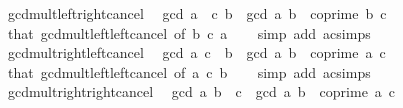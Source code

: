 \begin{isabellebody}
\isamarkupfalse%
%
\endisatagproof
{\isafoldproof}%
%
\isadelimproof
\isanewline
%
\endisadelimproof
\isanewline
{}\isamarkupfalse%
\ gcd{\isacharunderscore}{\kern0pt}mult{\isacharunderscore}{\kern0pt}left{\isacharunderscore}{\kern0pt}right{\isacharunderscore}{\kern0pt}cancel{\isacharcolon}{\kern0pt}\isanewline
\ \ {\isachardoublequoteopen}gcd\ {\isacharparenleft}{\kern0pt}a\ {\isacharasterisk}{\kern0pt}\ c{\isacharparenright}{\kern0pt}\ b\ {\isacharequal}{\kern0pt}\ gcd\ a\ b{\isachardoublequoteclose}\ \ {\isachardoublequoteopen}coprime\ b\ c{\isachardoublequoteclose}\isanewline
%
\isadelimproof
\ \ %
\endisadelimproof
%
\isatagproof
{}\isamarkupfalse%
\ that\ gcd{\isacharunderscore}{\kern0pt}mult{\isacharunderscore}{\kern0pt}left{\isacharunderscore}{\kern0pt}left{\isacharunderscore}{\kern0pt}cancel\ {\isacharbrackleft}{\kern0pt}of\ b\ c\ a{\isacharbrackright}{\kern0pt}\isanewline
\ \ \isamarkupfalse%
\ {\isacharparenleft}{\kern0pt}simp\ add{\isacharcolon}{\kern0pt}\ ac{\isacharunderscore}{\kern0pt}simps{\isacharparenright}{\kern0pt}%
\endisatagproof
{\isafoldproof}%
%
\isadelimproof
\isanewline
%
\endisadelimproof
\isanewline
{}\isamarkupfalse%
\ gcd{\isacharunderscore}{\kern0pt}mult{\isacharunderscore}{\kern0pt}right{\isacharunderscore}{\kern0pt}left{\isacharunderscore}{\kern0pt}cancel{\isacharcolon}{\kern0pt}\isanewline
\ \ {\isachardoublequoteopen}gcd\ a\ {\isacharparenleft}{\kern0pt}c\ {\isacharasterisk}{\kern0pt}\ b{\isacharparenright}{\kern0pt}\ {\isacharequal}{\kern0pt}\ gcd\ a\ b{\isachardoublequoteclose}\ \ {\isachardoublequoteopen}coprime\ a\ c{\isachardoublequoteclose}\isanewline
%
\isadelimproof
\ \ %
\endisadelimproof
%
\isatagproof
{}\isamarkupfalse%
\ that\ gcd{\isacharunderscore}{\kern0pt}mult{\isacharunderscore}{\kern0pt}left{\isacharunderscore}{\kern0pt}left{\isacharunderscore}{\kern0pt}cancel\ {\isacharbrackleft}{\kern0pt}of\ a\ c\ b{\isacharbrackright}{\kern0pt}\isanewline
\ \ \isamarkupfalse%
\ {\isacharparenleft}{\kern0pt}simp\ add{\isacharcolon}{\kern0pt}\ ac{\isacharunderscore}{\kern0pt}simps{\isacharparenright}{\kern0pt}%
\endisatagproof
{\isafoldproof}%
%
\isadelimproof
\isanewline
%
\endisadelimproof
\isanewline
{}\isamarkupfalse%
\ gcd{\isacharunderscore}{\kern0pt}mult{\isacharunderscore}{\kern0pt}right{\isacharunderscore}{\kern0pt}right{\isacharunderscore}{\kern0pt}cancel{\isacharcolon}{\kern0pt}\isanewline
\ \ {\isachardoublequoteopen}gcd\ a\ {\isacharparenleft}{\kern0pt}b\ {\isacharasterisk}{\kern0pt}\ c{\isacharparenright}{\kern0pt}\ {\isacharequal}{\kern0pt}\ gcd\ a\ b{\isachardoublequoteclose}\ \ {\isachardoublequoteopen}coprime\ a\ c{\isachardoublequoteclose}\isanewline

\end{isabellebody}
